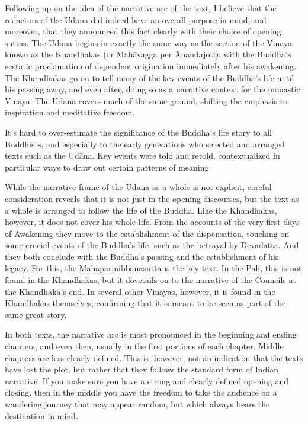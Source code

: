 \documentclass[12pt,openany]{book}%
\begin{document}
Following up on the idea of the narrative arc of the text, I believe that the redactors of the \textsanskrit{Udāna} did indeed have an overall purpose in mind; and moreover, that they announced this fact clearly with their choice of opening suttas. The \textsanskrit{Udāna} begins in exactly the same way as the section of the Vinaya known as the Khandhakas (or \textsanskrit{Mahāvagga} per Ānandajoti): with the Buddha’s ecstatic proclamation of dependent origination immediately after his awakening. The Khandhakas go on to tell many of the key events of the Buddha’s life until his passing away, and even after, doing so as a narrative context for the monastic Vinaya. The \textsanskrit{Udāna} covers much of the same ground, shifting the emphasis to inspiration and meditative freedom.

It’s hard to over-estimate the significance of the Buddha’s life story to all Buddhists, and especially to the early generations who selected and arranged texts such as the \textsanskrit{Udāna}. Key events were told and retold, contextualized in particular ways to draw out certain patterns of meaning.

While the narrative frame of the \textsanskrit{Udāna} as a whole is not explicit, careful consideration reveals that it is not just in the opening discourses, but the text as a whole is arranged to follow the life of the Buddha. Like the Khandhakas, however, it does not cover his whole life. From the accounts of the very first days of Awakening they move to the establishment of the dispensation, touching on some crucial events of the Buddha’s life, such as the betrayal by Devadatta. And they both conclude with the Buddha’s passing and the establishment of his legacy. For this, the \textsanskrit{Mahāparinibbānasutta} is the key text. In the Pali, this is not found in the Khandhakas, but it dovetails on to the narrative of the Councils at the Khandhaka’s end. In several other Vinayas, however, it is found in the Khandhakas themselves, confirming that it is meant to be seen as part of the same great story.

In both texts, the narrative arc is most pronounced in the beginning and ending chapters, and even then, usually in the first portions of each chapter. Middle chapters are less clearly defined. This is, however, not an indication that the texts have lost the plot, but rather that they follows the standard form of Indian narrative. If you make sure you have a strong and clearly defined opening and closing, then in the middle you have the freedom to take the audience on a wandering journey that may appear random, but which always bears the destination in mind.
\end{document}
